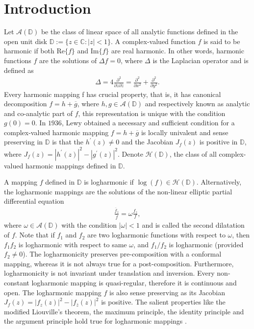 \documentclass[a4paper,12pt]{amsart}
\theoremstyle{plain}
\theoremstyle{definition}
\newcounter {own}
\begin{document}
\section{\bf Introduction}
Let $\mathcal{A}(\mathbb{D})$ be the class of linear space of all analytic functions defined in the open unit disk $\mathbb{D} := \{z \in \mathbb{C} : |z| < 1\}$. A complex-valued function $f$ is said to be harmonic if both $\mathrm{Re}\{f\}$ and $\mathrm{Im}\{f\}$ are real harmonic. In other words, harmonic functions $f$ are the solutions of $\Delta f = 0$, where $\Delta$ is the Laplacian operator and is defined as 
\begin{align*}
	\Delta =4\frac{\partial^2}{\partial z\partial\overline{z}} =\frac{\partial^2}{\partial x^2} + \frac{\partial^2}{\partial y^2}.
\end{align*}
Every harmonic mapping f has crucial property, that is, it has canonical decomposition $f=h+\overline{g}$, where $h,g\in\mathcal{A} (\mathbb{D})$ and respectively known as analytic and co-analytic
part of $f$, this representation is unique with the condition $g(0)=0$. In $ 1936 $, Lewy \cite{Lewy-BAMS-1936} obtained a necessary and sufficient condition for a complex-valued harmonic mapping $f=h+\overline{g} $ is locally univalent and sense preserving in $ \mathbb{D} $ is that the $ h^{\prime}(z)\neq 0 $ and the Jacobian $ J_f(z) $ is positive in $ \mathbb{D} $, where $ J_f(z)= |h^{\prime}(z)|^2 - |g^{\prime}(z)|^2 $. Denote $\mathcal{H} (\mathbb{D})$, the class of all complex-valued harmonic mappings defined in $\mathbb{D}$.\vspace{1.5mm}

A mapping $f$ defined in $\mathbb{D}$ is logharmonic if $\log(f)\in \mathcal{H}(\mathbb{D})$. Alternatively, the logharmonic mappings are the solutions of the non-linear elliptic partial differential equation
\begin{align}\label{eq-1.1}
	\frac{\overline{f}_{\overline{z}}}{\overline{f}}=\omega \frac{f_z}{f},
\end{align}
where $\omega\in\mathcal{A}(\mathbb{D})$ with the condition $|\omega|<1$ and is called the second dilatation of $f$. Note that if $f_1$ and $f_2$ are two logharmonic functions with respect to $\omega$, then $f_1 f_2$ is logharmonic with respect to same $\omega$, and $f_1/f_2$ is logharmonic (provided $f_2\neq 0$). The logharmonicity preserves pre-composition with a conformal mapping, whereas it is not always true for a post-composition. Furthermore, logharmonicity is not invariant under translation and inversion. Every non-constant logharmonic mapping is quasi-regular, therefore it
is continuous and open. The logharmonic mapping $f$ is also sense preserving as its Jacobian $J_f(z)= |f_z(z)|^2 - |f_{\overline{z}}(z)| ^2$ is positive. The salient properties like the modified Liouville’s theorem, the maximum principle, the identity principle and the argument principle hold true for logharmonic mappings \cite{Abdulhadi-Ali-AAA-2012,Meng-Ponnusamy-Qiao-JGA-2024}. \vspace{1.5mm}
\end{document}
